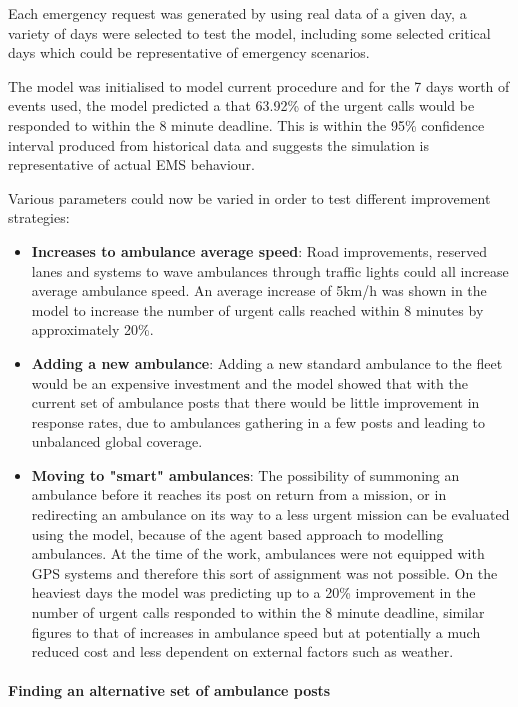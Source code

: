 \documentclass[11pt]{article} %
\begin{document}
Each emergency request was generated by using real data of a given day, a variety of days were selected to test the model, including some selected critical days which could be representative of emergency scenarios. 

The model was initialised to model current procedure and for the 7 days worth of events used, the model predicted a that 63.92\% of the urgent calls would be responded to within the 8 minute deadline. This is within the 95\% confidence interval produced from historical data and suggests the simulation is representative of actual EMS behaviour. 

Various parameters could now be varied in order to test different improvement strategies:
\begin{itemize}
	\item \textbf{Increases to  ambulance average speed}: Road improvements, reserved lanes and systems to wave ambulances through traffic lights could all increase average ambulance speed. An average increase of 5km/h was shown in the model to increase the number of urgent calls reached within 8 minutes by approximately 20\%.
	\item \textbf{Adding a new ambulance}:  Adding a new standard ambulance to the fleet would be an expensive investment and the model showed that with the current set of ambulance posts that there would be little improvement in response rates, due to ambulances gathering in a few posts and leading to unbalanced global coverage. 
	\item \textbf{Moving to "smart" ambulances}: The possibility of summoning an ambulance before it reaches its post on return from a mission, or in redirecting an ambulance on its way to a less urgent mission can be evaluated using the model, because of the agent based approach to modelling ambulances. At the time of the work, ambulances were not equipped with GPS systems and therefore this sort of assignment was not possible. On the heaviest days the model was predicting up to a 20\% improvement in the number of urgent calls responded to within the 8 minute deadline, similar figures to that of increases in ambulance speed but at potentially a much reduced cost and less dependent on external factors such as weather. 
\end{itemize}

\paragraph{Finding an alternative set of ambulance posts}
\end{document}
